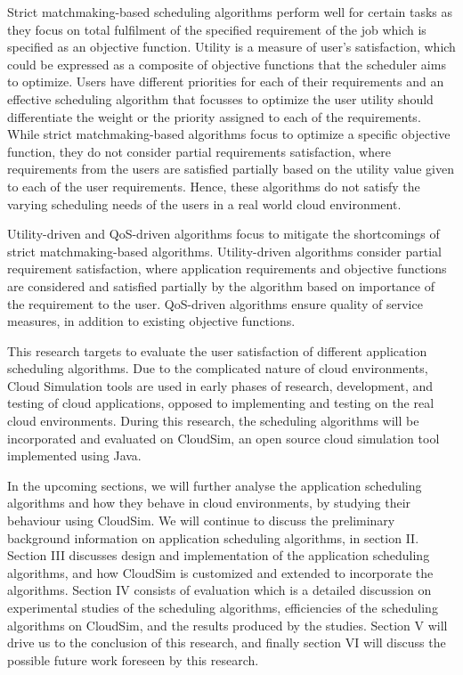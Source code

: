 \documentclass{llncs}
\begin{document}
Strict matchmaking-based scheduling algorithms perform well for certain tasks as they focus on total fulfilment of the specified requirement of the job which is specified as an objective function. Utility is a measure of user's satisfaction, which could be expressed as a composite of objective functions that the scheduler aims to optimize. Users have different priorities for each of their requirements and an effective scheduling algorithm that focusses to optimize the user utility should differentiate the weight or the priority assigned to each of the requirements. While strict matchmaking-based algorithms focus to optimize a specific objective function, they do not consider partial requirements satisfaction, where requirements from the users are satisfied partially based on the utility value given to each of the user requirements\cite{resumo}. Hence, these algorithms do not satisfy the varying scheduling needs of the users in a real world cloud environment.

Utility-driven and QoS-driven algorithms focus to mitigate the shortcomings of strict matchmaking-based algorithms. Utility-driven algorithms consider partial requirement satisfaction, where application requirements and objective functions are considered and satisfied partially by the algorithm based on importance of the requirement to the user. QoS-driven algorithms ensure quality of service measures, in addition to existing objective functions.

This research targets to evaluate the user satisfaction of different application scheduling algorithms. Due to the complicated nature of cloud environments, Cloud Simulation tools are used in early phases of research, development, and testing of cloud applications, opposed to implementing and testing on the real cloud environments. During this research, the scheduling algorithms will be incorporated and evaluated on CloudSim\cite{cloudsim}, an open source cloud simulation tool implemented using Java.

In the upcoming sections, we will further analyse the application scheduling algorithms and how they behave in cloud environments, by studying their behaviour using CloudSim. We will continue to discuss the preliminary background information on application scheduling algorithms, in section II. Section III discusses design and implementation of the application scheduling algorithms, and how CloudSim is customized and extended to incorporate the algorithms. Section IV consists of evaluation which is a detailed discussion on experimental studies of the scheduling algorithms, efficiencies of the scheduling algorithms on CloudSim, and the results produced by the studies. Section V will drive us to the conclusion of this research, and finally section VI will discuss the possible future work foreseen by this research.
\end{document}
